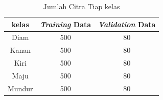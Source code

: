 \begin{table}[H]
  \centering
  \caption{Jumlah Citra Tiap kelas}
  \label{tab:tiapkelas}
  \begin{tabular}{|c|c|c|}
  \hline
  kelas  & \emph{Training} Data & \emph{Validation} Data \\ \hline
  Diam   & 500        & 80              \\ \hline
  Kanan  & 500        & 80              \\ \hline
  Kiri   & 500        & 80              \\ \hline
  Maju   & 500        & 80              \\ \hline
  Mundur & 500        & 80              \\ \hline
  \end{tabular}
\end{table}

